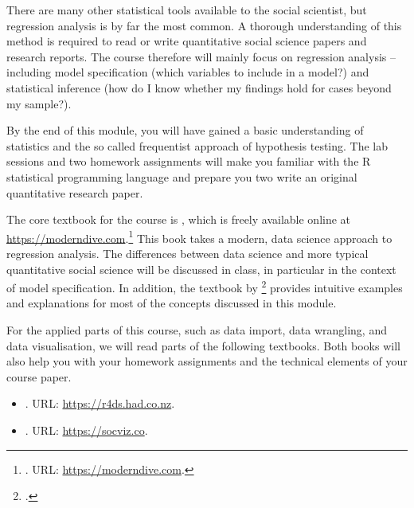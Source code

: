 \documentclass[abstract=on,parskip=full,headings=standardclasses,fontsize=11pt,paper=a4]{scrartcl}
\begin{document}
There are many other statistical tools available to the social scientist, but regression analysis is by far the most common. A thorough understanding of this method is required to read or write quantitative social science papers and research reports. The course therefore will mainly focus on regression analysis -- including model specification (which variables to include in a model?) and statistical inference (how do I know whether my findings hold for cases beyond my sample?).

By the end of this module, you will have gained a basic understanding of statistics and the so called frequentist approach of hypothesis testing. The lab sessions and two homework assignments will make you familiar with the \textsf{R} statistical programming language and prepare you two write an original quantitative research paper. 


The core textbook for the course is \textcite{ismay20}, which is freely available online at \url{https://moderndive.com}.\footnote{. URL: \url{https://moderndive.com}.} This book takes a modern, data science approach to regression analysis. The differences between data science and more typical quantitative social science will be discussed in class, in particular in the context of model specification. In addition, the textbook by \textcite{llaudet22}\footnote{.} provides intuitive examples and explanations for most of the concepts discussed in this module. %

For the applied parts of this course, such as data import, data wrangling, and data visualisation, we will read parts of the following textbooks. Both books will also help you with your homework assignments and the technical elements of your course paper. 

\begin{itemize}
\item {}. URL: \url{https://r4ds.had.co.nz}.
\item {}. URL: \url{https://socviz.co}.
\end{itemize}
\end{document}

